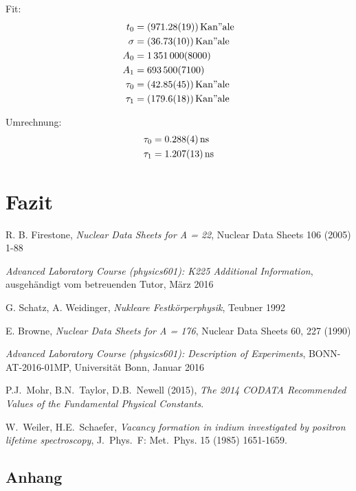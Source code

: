 \documentclass[11pt, a4paper]{article}
\numberwithin{equation}{section}
\begin{document}
Fit:
\begin{align*}
	t_0 &= (\num{971.28 +- 0.19})\, \mathrm{Kan"ale}\\
	\sigma &= (\num{36.73 +- 0.10})\, \mathrm{Kan"ale}\\
	A_0 &= \num{1351000 +- 8000}\\
	A_1 &= \num{693500 +- 7100}\\
	\tau_0 &= (\num{42.85 +- 0.45})\, \mathrm{Kan"ale}\\
	\tau_1 &= (\num{179.6 +- 1.8})\, \mathrm{Kan"ale} 
\end{align*}

Umrechnung:
\begin{align*}
	\tau_0 &= \SI{0.288 +- 0.004}{ns}\\
	\tau_1 &= \SI{1.207 +- 0.013}{ns}
\end{align*}



\section{Fazit}

\FloatBarrier
\vspace{\fill}
\begin{thebibliography}{19}
	R. B. Firestone, \emph{Nuclear Data Sheets for A = 22}, Nuclear Data Sheets 106 (2005) 1-88
	
	\emph{Advanced Laboratory Course (physics601): K225 Additional Information}, ausgehändigt vom betreuenden Tutor, März 2016
	
	G. Schatz, A. Weidinger, \emph{Nukleare Festkörperphysik}, Teubner 1992
	
	E. Browne, \emph{Nuclear Data Sheets for A = 176}, Nuclear Data Sheets 60, 227 (1990)
	
	\emph{Advanced Laboratory Course (physics601): Description of Experiments}, BONN-AT-2016-01MP, Universität Bonn, Januar 2016

	P.J.\ Mohr, B.N.\ Taylor, D.B.\ Newell (2015),
	\emph{The 2014 CODATA Recommended Values of the Fundamental Physical Constants}.

	W.\ Weiler, H.E.\ Schaefer,
	\emph{Vacancy formation in indium investigated by positron lifetime spectroscopy},
	J.\ Phys.\ F: Met.\ Phys. 15 (1985) 1651-1659.
\end{thebibliography}

\begin{appendix}
\newpage
\section{Anhang}


\end{appendix}
\end{document}
